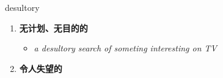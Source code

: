 
\begin{frame}
{\huge desultory}
\begin{center}
\begin{enumerate}\Large
  \item \textbf{无计划、无目的的}
  \begin{itemize}
    \item \em{\Large{a desultory search of someting interesting on TV}}
  \end{itemize}
  \item \textbf{令人失望的}
\end{enumerate}
\end{center}
\end{frame}
